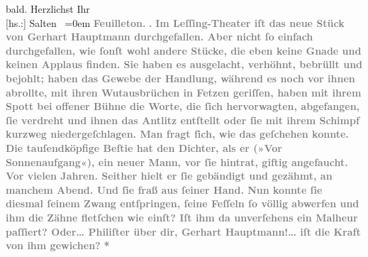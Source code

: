 \begin{ledgroupsized}[t]{13cm}
               bald. \pend
           \pstart
           Herzlichst Ihr {\\[\baselineskip]}{[}hs.:{]} \spacefill\mbox{Salten }\pend
           \leftskip=0em{}{\bigskip}\pstart
           \noindent{}\centering{}{\pb}\textcolor{gray}{\textbf{\textbf{Feuilleton.}}}\pend
           \pstart
           \noindent{}\centering{}\textcolor{gray}{\textbf{\textbf{.}}}\pend
           \pstart
           \noindent{}\textcolor{gray}{\textbf{Im Leſſing-Theater iſt das
                  neue Stück von Gerhart Hauptmann
                  durchgefallen. Aber nicht ſo einfach durchgefallen, wie ſonſt wohl andere Stücke,
                  die eben keine Gnade und keinen Applaus finden. Sie haben es ausgelacht, verhöhnt,
                  bebrüllt und bejohlt; haben das Gewebe der Handlung, während es noch vor ihnen
                  abrollte, mit ihren Wutausbrüchen in Fetzen geriſſen, haben mit ihrem Spott bei
                  offener Bühne die Worte, die ſich hervorwagten, abgefangen, ſie verdreht und ihnen
                  das Antlitz entſtellt oder ſie mit ihrem Schimpf kurzweg niedergeſchlagen. Man
                  fragt ſich, wie das geſchehen konnte. Die tauſendköpfige Beſtie hat den Dichter,
                  als er (»Vor Sonnenaufgang«), ein neuer Mann,
                  vor ſie hintrat, giftig angefaucht. Vor vielen Jahren. Seither hielt er ſie
                  gebändigt und gezähmt, an manchem Abend. Und ſie fraß aus ſeiner Hand. Nun konnte
                  ſie diesmal ſeinem Zwang entſpringen, ſeine Feſſeln ſo völlig abwerfen und ihm die
                  Zähne fletſchen wie einſt? Iſt ihm da unverſehens ein Malheur paſſiert? Oder{\dots} Philiſter über dir, Gerhart Hauptmann!{\dots} iſt die Kraft von ihm
                  gewichen?}}\pend
           \pstart
           \centering{}\textcolor{gray}{\textbf{*}}\pend

\end{ledgroupsized}
